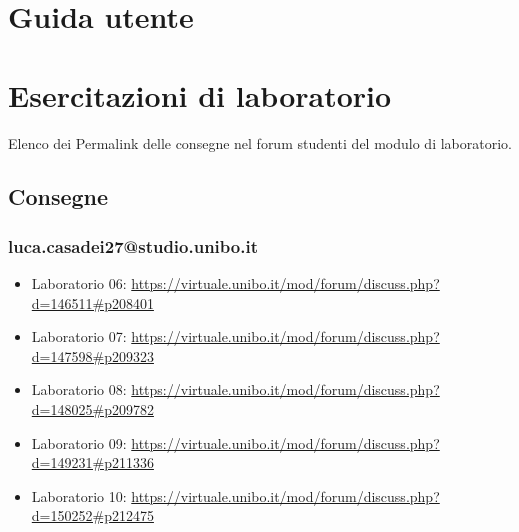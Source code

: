 \documentclass[a4paper,12pt]{report}
\begin{document}
\appendix
\chapter{Guida utente}

\chapter{Esercitazioni di laboratorio}
Elenco dei Permalink delle consegne nel forum studenti del modulo di laboratorio.
\section*{Consegne}
\subsection{luca.casadei27@studio.unibo.it}
\begin{itemize}
	\item Laboratorio 06: \url{https://virtuale.unibo.it/mod/forum/discuss.php?d=146511#p208401}
	\item Laboratorio 07: \url{https://virtuale.unibo.it/mod/forum/discuss.php?d=147598#p209323}
	\item Laboratorio 08: \url{https://virtuale.unibo.it/mod/forum/discuss.php?d=148025#p209782}
	\item Laboratorio 09: \url{https://virtuale.unibo.it/mod/forum/discuss.php?d=149231#p211336}
	\item Laboratorio 10: \url{https://virtuale.unibo.it/mod/forum/discuss.php?d=150252#p212475}
\end{itemize}
\end{document}
